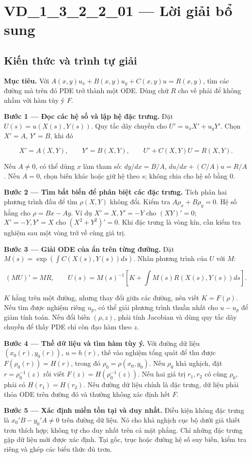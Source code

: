 \documentclass[10pt,a4paper]{article}
\begin{document}
\section*{VD\_1\_3\_2\_2\_01 — Lời giải bổ sung}
\subsection*{Kiến thức và trình tự giải}
\textbf{Mục tiêu.} Với $A(x,y)u_x+B(x,y)u_y+C(x,y)u=R(x,y)$, tìm các đường mà trên đó PDE trở thành một ODE. Dùng chữ $R$ cho vế phải để không nhầm với hàm tùy ý $F$.

\textbf{Bước 1 — Đọc các hệ số và lập hệ đặc trưng.} Đặt $U(s)=u(X(s),Y(s))$. Quy tắc dây chuyền cho $U'=u_xX'+u_yY'$. Chọn $X'=A$, $Y'=B$, khi đó

\[
X'=A(X,Y),\qquad Y'=B(X,Y),\qquad U'+C(X,Y)U=R(X,Y).
\]

Nếu $A\ne0$, có thể dùng $x$ làm tham số: $dy/dx=B/A$, $du/dx+(C/A)u=R/A$. Nếu $A=0$, chọn biến khác hoặc giữ hệ theo $s$; không chia cho hệ số bằng 0.

\textbf{Bước 2 — Tìm bất biến để phân biệt các đặc trưng.} Tích phân hai phương trình đầu để tìm $\rho(X,Y)$ không đổi. Kiểm tra $A\rho_x+B\rho_y=0$. Hệ số hằng cho $\rho=Bx-Ay$. Ví dụ $X'=X,Y'=-Y$ cho $(XY)'=0$; $X'=-Y,Y'=X$ cho $(X^2+Y^2)'=0$. Khi đặc trưng là vòng kín, cần kiểm tra nghiệm sau một vòng trở về cùng giá trị.

\textbf{Bước 3 — Giải ODE của ẩn trên từng đường.} Đặt $M(s)=\exp(\int C(X(s),Y(s))ds)$. Nhân phương trình của $U$ với $M$:

\[
(MU)'=MR,\qquad
U(s)=M(s)^{-1}\left[K+\int M(s)R(X(s),Y(s))ds\right].
\]

$K$ hằng trên một đường, nhưng thay đổi giữa các đường, nên viết $K=F(\rho)$. Nếu tìm được nghiệm riêng $u_p$, có thể giải phương trình thuần nhất cho $u-u_p$ để giảm tính toán. Nếu đổi biến $(\rho,z)$, phải tính Jacobian và dùng quy tắc dây chuyền để thấy PDE chỉ còn đạo hàm theo $z$.

\textbf{Bước 4 — Thế dữ liệu và tìm hàm tùy ý.} Với đường dữ liệu $(x_0(r),y_0(r))$, $u=h(r)$, thế vào nghiệm tổng quát để thu được $F(\rho_0(r))=H(r)$, trong đó $\rho_0=\rho(x_0,y_0)$. Nếu $\rho_0$ khả nghịch, đặt $r=\rho_0^{-1}(z)$ rồi viết $F(z)=H(\rho_0^{-1}(z))$. Nếu hai giá trị $r_1,r_2$ có cùng $\rho_0$, phải có $H(r_1)=H(r_2)$. Nếu đường dữ liệu chính là đặc trưng, dữ liệu phải thỏa ODE trên đường đó và thường không xác định hết $F$.

\textbf{Bước 5 — Xác định miền tồn tại và duy nhất.} Điều kiện không đặc trưng là $x_0'B-y_0'A\ne0$ trên đường dữ liệu. Nó cho khả nghịch cục bộ dưới giả thiết trơn thích hợp; không tự cho duy nhất trên cả mặt phẳng. Chỉ những đặc trưng gặp dữ liệu mới được xác định. Tại gốc, trục hoặc đường hệ số suy biến, kiểm tra riêng và ghép các biểu thức đủ trơn.
\end{document}
